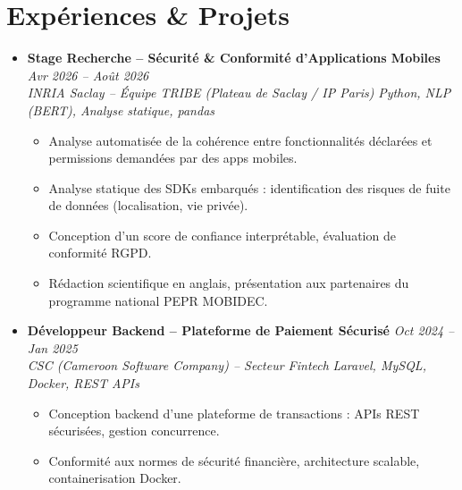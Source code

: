 \documentclass[a4paper,11pt]{article}
\begin{document}
\section{Expériences \& Projets}
\begin{itemize}[leftmargin=*, label={-}]

\item \textbf{Stage Recherche -- Sécurité \& Conformité d'Applications Mobiles} \hfill \textit{Avr 2026 -- Août 2026} \\
\textit{INRIA Saclay -- Équipe TRIBE (Plateau de Saclay / IP Paris)} \hfill \textit{Python, NLP (BERT), Analyse statique, pandas}
\vspace{-2pt}
    \begin{itemize}[leftmargin=0.4cm, nosep, label=\tiny$\bullet$]
        \item \small{Analyse automatisée de la cohérence entre fonctionnalités déclarées et permissions demandées par des apps mobiles.}
        \item \small{Analyse statique des SDKs embarqués : identification des risques de fuite de données (localisation, vie privée).}
        \item \small{Conception d'un score de confiance interprétable, évaluation de conformité RGPD.}
        \item \small{Rédaction scientifique en anglais, présentation aux partenaires du programme national PEPR MOBIDEC.}
    \end{itemize}
\vspace{3pt}

\item \textbf{Développeur Backend -- Plateforme de Paiement Sécurisé} \hfill \textit{Oct 2024 -- Jan 2025} \\
\textit{CSC (Cameroon Software Company) -- Secteur Fintech} \hfill \textit{Laravel, MySQL, Docker, REST APIs}
\vspace{-2pt}
    \begin{itemize}[leftmargin=0.4cm, nosep, label=\tiny$\bullet$]
        \item \small{Conception backend d'une plateforme de transactions : APIs REST sécurisées, gestion concurrence.}
        \item \small{Conformité aux normes de sécurité financière, architecture scalable, containerisation Docker.}
    \end{itemize}
\vspace{3pt}


\end{itemize}
\end{document}
